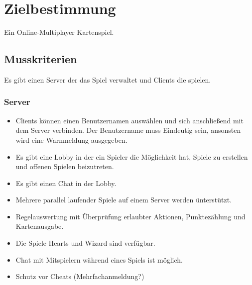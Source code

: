 \documentclass{article}
\begin{document}
\tableofcontents

\section{Zielbestimmung}
Ein Online-Multiplayer Kartenspiel.

\subsection{Musskriterien}
Es gibt einen \gls{Server} der das Spiel verwaltet und \glspl{Client} die spielen.
\subsubsection{\gls{Server}}
\begin{itemize}
	\item \glspl{Client} können einen Benutzernamen auswählen und sich anschließend mit dem Server verbinden.
		Der Benutzername muss Eindeutig sein, ansonsten wird eine Warnmeldung ausgegeben.
	\item Es gibt eine \gls{Lobby} in der ein Spieler die Möglichkeit hat, Spiele zu erstellen und offenen Spielen beizutreten.
	\item Es gibt einen Chat in der \gls{Lobby}.
	\item Mehrere parallel laufender Spiele auf einem Server werden ünterstützt.
	\item Regelauswertung mit Überprüfung erlaubter Aktionen, Punktezählung und  Kartenausgabe.
	\item Die Spiele Hearts und Wizard sind verfügbar.	
	\item Chat mit Mitspielern während eines Spiels ist möglich.
	\item Schutz vor Cheats (Mehrfachanmeldung?)
\end{itemize}
\end{document}
